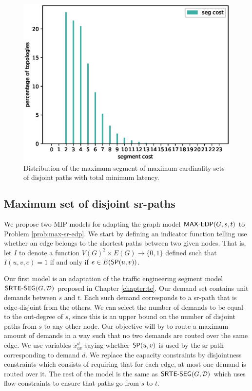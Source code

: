 \begin{figure}
\begin{center}
\includegraphics[width=.85\columnwidth]{./Network-lib/data/plot/minCostEDP_segcost.eps}
\end{center}
\caption{Distribution of the maximum segment of maximum cardinality sets of disjoint paths with total minimum latency.}
\label{fig:minCostEDP_segcost}
\end{figure}

\subsection{Maximum set of disjoint sr-paths}

We propose two MIP models for adapting the graph model $\maxedp(G, s, t)$ to Problem \ref{prob:max-sr-edp}. We start by defining
an indicator function telling use whether an edge belongs to the shortest paths between two given nodes.
That is, let $I$ to denote a function $V(G)^2 \times E(G) \rightarrow \{0, 1\}$ defined such that $I(u, v, e) = 1$ if and only if $e \in E(\sp(u, v))$.

Our first model is an adaptation of the traffic engineering segment model $\srteseg(G, \mathcal{D})$ proposed in Chapter \ref{chapter:te}. 
Our demand set contains unit demands between $s$ and $t$. Each such demand corresponds to a sr-path that is edge-disjoint from the
others. We can select the number of demands to be equal to the out-degree of $s$, since this is an upper bound on the number
of disjoint paths from $s$ to any other node. Our objective will by to route a maximum
amount of demands in a way such that no two demands are routed over the same edge. We use variables $x^d_{uv}$ 
saying whether $\sp(u, v)$ is used by the sr-path corresponding to demand $d$. We replace the capacity constraints
by disjointness constraints which consists of requiring that for each edge, at most one demand is routed over it. The rest of the model
is the same as $\srteseg(G, \mathcal{D})$ which uses flow constraints to ensure that paths go from $s$ to $t$.

